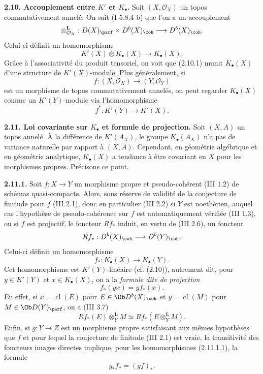 \documentclass[11pt]{article}
\newcommand{\cl}{\operatorname{cl}}
\begin{document}
\textbf{2.10. Accouplement entre \(K'\) et \(K_{\bullet}\).} Soit \((X,\mathcal O_X)\) un topos commutativement annelé. On sait (I 5.8.4 b) que l'on a un accouplement
\[
 \otimes_{\mathcal O_X}^{\mathbf L}:D(X)_{\parf}\times D^b(X)_{\coh}
 \longrightarrow D^b(X)_{\coh}.
\]
Celui-ci définit un homomorphisme
\begin{equation}\tag{2.10.1}
 K'(X)\otimes K_{\bullet}(X)\longrightarrow K_{\bullet}(X).
\end{equation}
Grâce à l'associativité du produit tensoriel, on voit que (2.10.1) munit \(K_{\bullet}(X)\) d'une structure de \(K'(X)\)-module. Plus généralement, si
\[
 f:(X,\mathcal O_X)\longrightarrow(Y,\mathcal O_Y)
\]
est un morphisme de topos commutativement annelés, on peut regarder \(K_{\bullet}(X)\) comme un \(K'(Y)\)-module via l'homomorphisme
\[
 f^*:K'(Y)\longrightarrow K'(X).
\]

\textbf{2.11. Loi covariante sur \(K_{\bullet}\) et formule de projection.} Soit \((X,A)\) un topos annelé. À la différence de \(K'(A_X)\), le groupe \(K_{\bullet}(A_X)\) n'a pas de variance naturelle par rapport à \((X,A)\). Cependant, en géométrie algébrique et en géométrie analytique, \(K_{\bullet}(X)\) a tendance à être covariant en \(X\) pour les morphismes propres. Précisons ce point.

\textbf{2.11.1.} Soit \(f:X\to Y\) un morphisme propre et pseudo-cohérent (III 1.2) de schémas quasi-compacts. Alors, sous réserve de validité de la conjecture de finitude pour \(f\) (III 2.1), donc en particulier (III 2.2) si \(Y\) est noethérien, auquel cas l'hypothèse de pseudo-cohérence sur \(f\) est automatiquement vérifiée (III 1.3), ou si \(f\) est projectif, le foncteur \(Rf_*\) induit, en vertu de (III 2.6), un foncteur
\[
 Rf_*:D^b(X)_{\coh}\longrightarrow D^b(Y)_{\coh}.
\]
Celui-ci définit un homomorphisme
\begin{equation}\tag{2.11.1.1}
 f_*:K_{\bullet}(X)\longrightarrow K_{\bullet}(Y).
\end{equation}
Cet homomorphisme est \(K'(Y)\)-linéaire (cf. (2.10)), autrement dit, pour \(y\in K'(Y)\) et \(x\in K_{\bullet}(X)\), on a la \emph{formule dite de projection}
\begin{equation}\tag{2.11.1.2}
 f_*(yx)=y f_*(x).
\end{equation}
En effet, si \(x=\cl(E)\) pour \(E\in\Ob D^b(X)_{\coh}\) et \(y=\cl(M)\) pour \(M\in\Ob D(Y)_{\parf}\), on a (III 3.7)
\[
 Rf_*(E)\otimes_Y^{\mathbf L}M\simeq
 Rf_*(E\otimes_Y^{\mathbf L}M).
\]
Enfin, si \(g:Y\to Z\) est un morphisme propre satisfaisant aux mêmes hypothèses que \(f\) et pour lequel la conjecture de finitude (III 2.1) est vraie, la transitivité des foncteurs images directes implique, pour les homomorphismes (2.11.1.1), la formule
\begin{equation}\tag{2.11.1.3}
 g_*f_*=(gf)_*.
\end{equation}
\end{document}
